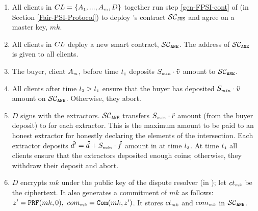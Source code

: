 \begin{enumerate}[leftmargin=5mm]


\item\label{e-psi::call-F-PSI-stepOne}  All clients in ${CL}=\{ A_{\scriptscriptstyle 1},...,   A_{\scriptscriptstyle m},  D\}$ together run step \ref{gen-FPSI-cont} of \fpsi (in Section \ref{Fair-PSI-Protocol}) to deploy \fpsi's contract $\mathcal{SC}_{\mathtt{JUS}}$ and agree on a  master key, $mk$. 

\item\label{e-psi::deploy-SC-E-PSI} All clients in ${CL}$  deploy a new smart contract, $\mathcal{SC}_{\mathtt{ANE}}$. The address of $\mathcal{SC}_{\mathtt{ANE}}$ is given to all clients. 

\item The buyer, client $ { A}_{\scriptscriptstyle {  m}}$, before time $t_{\scriptscriptstyle 1}$ deposits $S_{\scriptscriptstyle min}\cdot \ddot{v}$  amount to $\mathcal{SC}_{\mathtt{ANE}}$. 
\item\label{e-PSI::buyer-deposit} All clients after  time $t_{\scriptscriptstyle 2}>t_{\scriptscriptstyle 1}$ ensure that the buyer has deposited $S_{\scriptscriptstyle min}\cdot \ddot{v}$ amount on $\mathcal{SC}_{\mathtt{ANE}}$. Otherwise, they abort.



\item\label{e-PSI::extractor-deposit} $D$ signs \SCpc with the extractors. $\mathcal{SC}_{\mathtt{ANE}}$ transfers $S_{\scriptscriptstyle min}\cdot \ddot{r}$ amount (from the buyer deposit) to \SCpc for each extractor. This is the maximum amount to be paid to an honest extractor for honestly declaring the elements of the intersection. %
%
Each extractor  deposits $\ddot{d}'=\ddot{d}+S_{\scriptscriptstyle min}\cdot \ddot{f}$ amount in \SCpc at time $t_{\scriptscriptstyle 3}$. At time $t_{\scriptscriptstyle 4}$ all clients ensure that the extractors deposited enough coins; otherwise, they withdraw their deposit and abort. 

%
\item\label{e-psi::commit-to-mk} $D$ encrypts $mk$ under the public key of the dispute resolver (in \SCpc); let $ct_{\scriptscriptstyle mk}$ be the ciphertext.  It also generates a commitment of $mk$ as follows: $z'=\mathtt{PRF}(mk, 0),\ com_{\scriptscriptstyle mk}=\mathtt{Com}(mk, z')$. It stores $ct_{\scriptscriptstyle mk}$  and ${com}_{\scriptscriptstyle mk}$ in $\mathcal{SC}_{\mathtt{ANE}}$. 



\end{enumerate}
